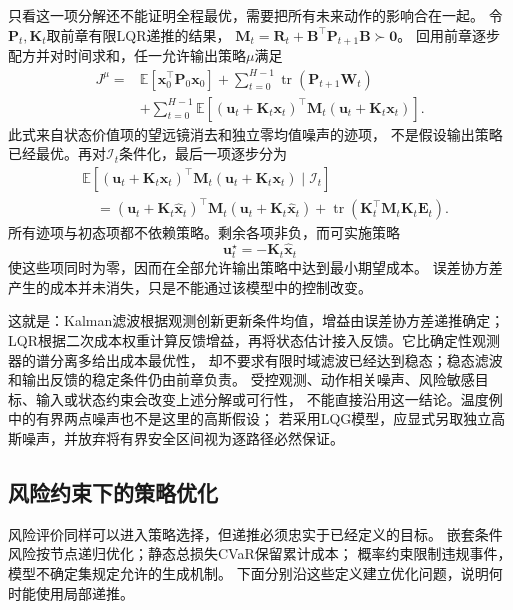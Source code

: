 只看这一项分解还不能证明全程最优，需要把所有未来动作的影响合在一起。
令$\bm P_t,\bm K_t$取前章有限LQR递推的结果，
$\bm M_t=\bm R_t+\bm B^\top\bm P_{t+1}\bm B\succ\bm0$。
回用前章逐步配方并对时间求和，任一允许输出策略$\mu$满足
\begin{align*}
  J^\mu={}&
    \mathbb E[\bm x_0^\top\bm P_0\bm x_0]
    +\sum_{t=0}^{H-1}\operatorname{tr}(\bm P_{t+1}\bm W_t)\\
    &+\sum_{t=0}^{H-1}\mathbb E[
      (\bm u_t+\bm K_t\bm x_t)^\top
      \bm M_t(\bm u_t+\bm K_t\bm x_t)].
\end{align*}
此式来自状态价值项的望远镜消去和独立零均值噪声的迹项，
不是假设输出策略已经最优。再对$\mathcal I_t$条件化，最后一项逐步分为
\begin{align*}
  &\mathbb E[
    (\bm u_t+\bm K_t\bm x_t)^\top\bm M_t
    (\bm u_t+\bm K_t\bm x_t)\mid\mathcal I_t]\\
  &\quad=
    (\bm u_t+\bm K_t\widehat{\bm x}_t)^\top\bm M_t
    (\bm u_t+\bm K_t\widehat{\bm x}_t)
    +\operatorname{tr}(\bm K_t^\top\bm M_t\bm K_t\bm E_t).
\end{align*}
所有迹项与初态项都不依赖策略。剩余各项非负，而可实施策略
\begin{equation}
  \bm u_t^\star=-\bm K_t\widehat{\bm x}_t
  \label{eq:policy-finite-lqg-feedback}
\end{equation}
使这些项同时为零，因而在全部允许输出策略中达到最小期望成本。
误差协方差产生的成本并未消失，只是不能通过该模型中的控制改变。

这就是：Kalman滤波根据观测创新更新条件均值，增益由误差协方差递推确定；
LQR根据二次成本权重计算反馈增益，再将状态估计接入反馈。它比确定性观测器的谱分离多给出成本最优性，
却不要求有限时域滤波已经达到稳态；稳态滤波和输出反馈的稳定条件仍由前章负责。
受控观测、动作相关噪声、风险敏感目标、输入或状态约束会改变上述分解或可行性，
不能直接沿用这一结论。温度例中的有界两点噪声也不是这里的高斯假设；
若采用LQG模型，应显式另取独立高斯噪声，并放弃将有界安全区间视为逐路径必然保证。

\subsection{风险约束下的策略优化}
\label{sec:policy-risk-optimization}

风险评价同样可以进入策略选择，但递推必须忠实于已经定义的目标。
嵌套条件风险按节点递归优化；静态总损失CVaR保留累计成本；
概率约束限制违规事件，模型不确定集规定允许的生成机制。
下面分别沿这些定义建立优化问题，说明何时能使用局部递推。

